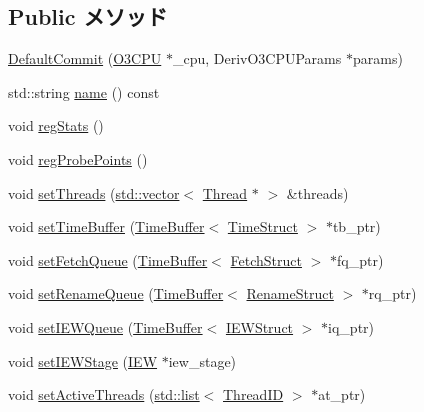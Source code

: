 \subsection*{Public メソッド}
\begin{DoxyCompactItemize}
\item 
\hyperlink{classDefaultCommit_ac5ef93cb7a09f9a537c03bb1d002f7a2}{DefaultCommit} (\hyperlink{classDefaultCommit_a44622cf06940413482836cb62931ac3f}{O3CPU} $\ast$\_\-cpu, DerivO3CPUParams $\ast$params)
\item 
std::string \hyperlink{classDefaultCommit_a37627d5d5bba7f4a8690c71c2ab3cb07}{name} () const 
\item 
void \hyperlink{classDefaultCommit_a4dc637449366fcdfc4e764cdf12d9b11}{regStats} ()
\item 
void \hyperlink{classDefaultCommit_aa2dab17a363fd4307274d579796adcf7}{regProbePoints} ()
\item 
void \hyperlink{classDefaultCommit_aa8150d8ab62e6314eb07420a63aedce2}{setThreads} (\hyperlink{classstd_1_1vector}{std::vector}$<$ \hyperlink{structO3ThreadState}{Thread} $\ast$ $>$ \&threads)
\item 
void \hyperlink{classDefaultCommit_a2b521ea5f191fff72265f60d4ed5187b}{setTimeBuffer} (\hyperlink{classTimeBuffer}{TimeBuffer}$<$ \hyperlink{structTimeStruct}{TimeStruct} $>$ $\ast$tb\_\-ptr)
\item 
void \hyperlink{classDefaultCommit_ad1be90519aa7737ddf8e41de079a5ea9}{setFetchQueue} (\hyperlink{classTimeBuffer}{TimeBuffer}$<$ \hyperlink{classDefaultCommit_a3aac8607069f16898ef53cfaa2d97aeb}{FetchStruct} $>$ $\ast$fq\_\-ptr)
\item 
void \hyperlink{classDefaultCommit_a701624f92a819fe4205faede6e614d9f}{setRenameQueue} (\hyperlink{classTimeBuffer}{TimeBuffer}$<$ \hyperlink{classDefaultCommit_a0c2a89ad2edad9ad605d0461f9b132a5}{RenameStruct} $>$ $\ast$rq\_\-ptr)
\item 
void \hyperlink{classDefaultCommit_a6b8bf7d75423c9bccd93d50470f7f935}{setIEWQueue} (\hyperlink{classTimeBuffer}{TimeBuffer}$<$ \hyperlink{classDefaultCommit_a7cf3f052f760b3a8a18623f792c10910}{IEWStruct} $>$ $\ast$iq\_\-ptr)
\item 
void \hyperlink{classDefaultCommit_a4b6d8e4b2cf6249763ed2fc73eb1af47}{setIEWStage} (\hyperlink{classDefaultCommit_a2e298f790f528754f0e0ffa0cb8088f6}{IEW} $\ast$iew\_\-stage)
\item 
void \hyperlink{classDefaultCommit_aab96bdacf8bd420402cbb543f994e054}{setActiveThreads} (\hyperlink{classstd_1_1list}{std::list}$<$ \hyperlink{base_2types_8hh_ab39b1a4f9dad884694c7a74ed69e6a6b}{ThreadID} $>$ $\ast$at\_\-ptr)

\end{DoxyCompactItemize}
